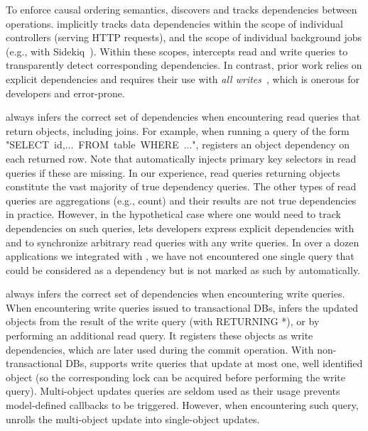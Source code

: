 To enforce causal ordering semantics, \synapse discovers and tracks
dependencies between \mbox{operations}.
\synapse implicitly tracks data dependencies within the scope of individual
controllers (serving HTTP requests), and the scope of individual background jobs (e.g., with
Sidekiq~\cite{sidekiq}). Within these scopes, \synapse intercepts read and
write queries to transparently detect corresponding dependencies.
In contrast, prior work relies on
explicit dependencies and requires their use with {\em all writes}~\cite{bolton,Bailis:2012:PDC:2391229.2391251}, which is onerous for developers and
error-prone.

\synapse always infers the correct set of dependencies when encountering read
queries that return objects, including joins. For example, when running a query
of the form \\ \mbox{{\code "SELECT id,... FROM table WHERE ..."}}, \synapse registers an
object dependency on each returned row. Note that \synapse automatically injects
primary key selectors in read queries if these are missing.
In our experience, read queries returning objects constitute the vast majority
of true dependency queries. The other types of read queries are aggregations
(e.g., count) and their results are not true dependencies in practice. However,
in the hypothetical case where one would need to track dependencies on such
queries, \synapse lets developers express explicit dependencies with 
{} and {}
to synchronize arbitrary read queries with any write queries.
In over a dozen applications we integrated with \synapse, we have not
encountered one single query that could be considered as a dependency but is not
marked as such by \synapse automatically.  

\synapse always infers the correct set of dependencies when
encountering write queries.
When encountering write queries issued to transactional DBs, \synapse infers
the updated objects from the result of the write query (with {\code RETURNING
*}), or by performing an additional read query.  It registers these objects as
write dependencies, which are later used during the commit operation. With
non-transactional DBs, \synapse supports write queries that update at most one,
well identified object (so the corresponding lock can be acquired before
performing the write query).  Multi-object updates queries are seldom used as
their usage prevents model-defined callbacks to be triggered. However, when
encountering such query, \synapse unrolls the multi-object update into
single-object updates.


